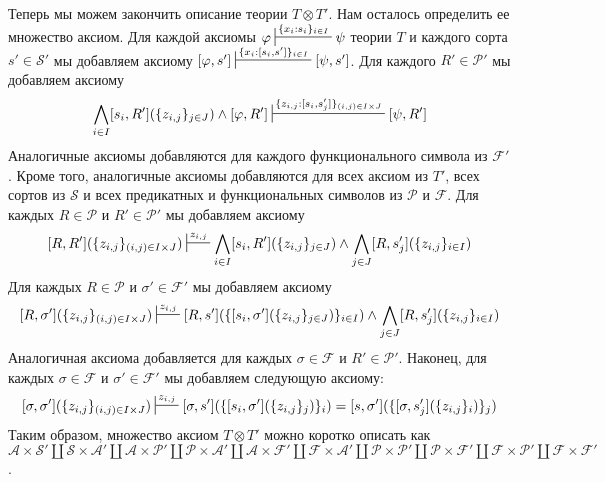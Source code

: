 \documentclass[reqno]{amsart}
\theoremstyle{definition}
\theoremstyle{remark}
\begin{document}
Теперь мы можем закончить описание теории $T \otimes T'$.
Нам осталось определить ее множество аксиом.
Для каждой аксиомы $\varphi \sststile{}{\{ x_i : s_i \}_{i \in I}} \psi$ теории $T$ и каждого сорта $s' \in \mathcal{S}'$ мы добавляем аксиому $[\varphi,s'] \sststile{}{\{ x_i : [s_i,s'] \}_{i \in I}} [\psi,s']$.
Для каждого $R' \in \mathcal{P}'$ мы добавляем аксиому
\[ \bigwedge_{i \in I} [s_i,R'](\{ z_{i,j} \}_{j \in J}) \land [\varphi,R'] \sststile{}{\{ z_{i,j} : [s_i,s_j'] \}_{(i,j) \in I \times J}} [\psi,R'] \]
Аналогичные аксиомы добавляются для каждого функционального символа из $\mathcal{F}'$.
Кроме того, аналогичные аксиомы добавляются для всех аксиом из $T'$, всех сортов из $\mathcal{S}$ и всех предикатных и функциональных символов из $\mathcal{P}$ и $\mathcal{F}$.
Для каждых $R \in \mathcal{P}$ и $R' \in \mathcal{P}'$ мы добавляем аксиому
\[ [R,R'](\{ z_{i,j} \}_{(i,j) \in I \times J}) \sststile{}{z_{i,j}} \bigwedge_{i \in I} [s_i,R'](\{ z_{i,j} \}_{j \in J}) \land \bigwedge_{j \in J} [R,s_j'](\{ z_{i,j} \}_{i \in I}) \]
Для каждых $R \in \mathcal{P}$ и $\sigma' \in \mathcal{F}'$ мы добавляем аксиому
\[ [R,\sigma'](\{ z_{i,j} \}_{(i,j) \in I \times J}) \sststile{}{z_{i,j}} [R,s'](\{ [s_i,\sigma'](\{ z_{i,j} \}_{j \in J}) \}_{i \in I}) \land \bigwedge_{j \in J} [R,s_j'](\{ z_{i,j} \}_{i \in I}) \]
Аналогичная аксиома добавляется для каждых $\sigma \in \mathcal{F}$ и $R' \in \mathcal{P}'$.
Наконец, для каждых $\sigma \in \mathcal{F}$ и $\sigma' \in \mathcal{F}'$ мы добавляем следующую аксиому:
\[ [\sigma,\sigma'](\{ z_{i,j} \}_{(i,j) \in I \times J}) \sststile{}{z_{i,j}} [\sigma,s'](\{ [s_i,\sigma'](\{ z_{i,j} \}_j) \}_i) = [s,\sigma'](\{ [\sigma,s_j'](\{ z_{i,j} \}_i) \}_j) \]
Таким образом, множество аксиом $T \otimes T'$ можно коротко описать как $\mathcal{A} \times \mathcal{S}' \amalg \mathcal{S} \times \mathcal{A}' \amalg \mathcal{A} \times \mathcal{P}' \amalg \mathcal{P} \times \mathcal{A}' \amalg \mathcal{A} \times \mathcal{F}' \amalg \mathcal{F} \times \mathcal{A}' \amalg \mathcal{P} \times \mathcal{P}' \amalg \mathcal{P} \times \mathcal{F}' \amalg \mathcal{F} \times \mathcal{P}' \amalg \mathcal{F} \times \mathcal{F}'$.
\end{document}

